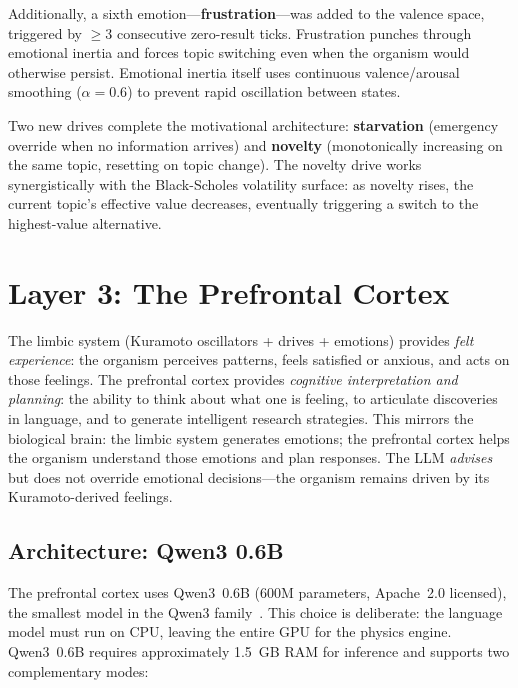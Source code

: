 \documentclass[11pt,a4paper,twocolumn]{article}
\begin{document}
Additionally, a sixth emotion---\textbf{frustration}---was added to the valence space, triggered by $\geq 3$ consecutive zero-result ticks.
Frustration punches through emotional inertia and forces topic switching even when the organism would otherwise persist.
Emotional inertia itself uses continuous valence/arousal smoothing ($\alpha = 0.6$) to prevent rapid oscillation between states.

Two new drives complete the motivational architecture: \textbf{starvation} (emergency override when no information arrives) and \textbf{novelty} (monotonically increasing on the same topic, resetting on topic change).
The novelty drive works synergistically with the Black-Scholes volatility surface: as novelty rises, the current topic's effective value decreases, eventually triggering a switch to the highest-value alternative.

\section{Layer 3: The Prefrontal Cortex}

The limbic system (Kuramoto oscillators + drives + emotions) provides \emph{felt experience}: the organism perceives patterns, feels satisfied or anxious, and acts on those feelings.
The prefrontal cortex provides \emph{cognitive interpretation and planning}: the ability to think about what one is feeling, to articulate discoveries in language, and to generate intelligent research strategies.
This mirrors the biological brain: the limbic system generates emotions; the prefrontal cortex helps the organism understand those emotions and plan responses.
The LLM \emph{advises} but does not override emotional decisions---the organism remains driven by its Kuramoto-derived feelings.

\subsection{Architecture: Qwen3 0.6B}

The prefrontal cortex uses Qwen3~0.6B (600M parameters, Apache~2.0 licensed), the smallest model in the Qwen3 family~\cite{qwen3_2026}.
This choice is deliberate: the language model must run on CPU, leaving the entire GPU for the physics engine.
Qwen3~0.6B requires approximately 1.5~GB RAM for inference and supports two complementary modes:
\end{document}
